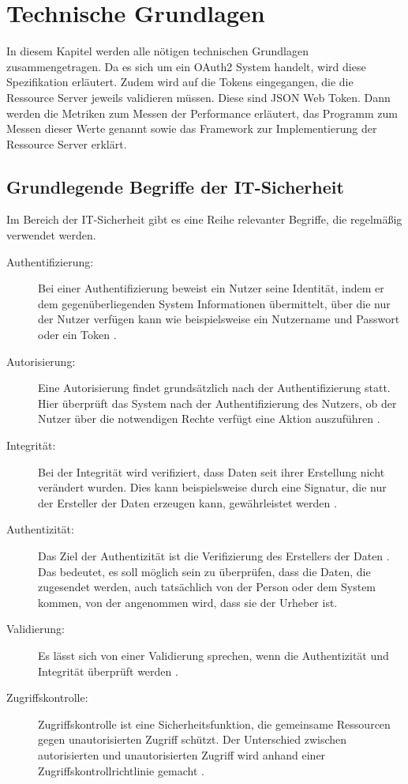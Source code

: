 \chapter{Technische Grundlagen}
\label{sec:TechnischeGrundlagen}
In diesem Kapitel werden alle nötigen technischen Grundlagen zusammengetragen. Da es sich um ein OAuth2 System handelt, wird diese Spezifikation erläutert. Zudem wird auf die Tokens eingegangen, die die Ressource Server jeweils validieren müssen. Diese sind \ac{JSON} Web Token. Dann werden die Metriken zum Messen der Performance erläutert, das Programm zum Messen dieser Werte genannt sowie das Framework zur Implementierung der Ressource Server erklärt. 

%
%
\section{Grundlegende Begriffe der IT-Sicherheit}
\label{sec:GrundlegenderBegriffederIT-Sicherheit}
Im Bereich der IT-Sicherheit gibt es eine Reihe relevanter Begriffe, die regelmäßig verwendet werden.

\begin{description}
  \item[Authentifizierung:] Bei einer Authentifizierung beweist ein Nutzer seine Identität, indem er dem gegenüberliegenden System Informationen übermittelt, über die nur der Nutzer verfügen kann wie beispielsweise ein Nutzername und Passwort oder ein Token \citep{Cankaya2011}.
  \item[Autorisierung:] Eine Autorisierung findet grundsätzlich nach der Authentifizierung statt. Hier überprüft das System nach der Authentifizierung des Nutzers, ob der Nutzer über die notwendigen Rechte verfügt eine Aktion auszuführen \citep{Authorization2011}. 
  \item[Integrität:] Bei der Integrität wird verifiziert, dass Daten seit ihrer Erstellung nicht verändert wurden. Dies kann beispielsweise durch eine Signatur, die nur der Ersteller der Daten erzeugen kann, gewährleistet werden \citep{connect2id:2021}.
  \item[Authentizität:] Das Ziel der Authentizität ist die Verifizierung des Erstellers der Daten \citep{connect2id:2021}. Das bedeutet, es soll möglich sein zu überprüfen, dass die Daten, die zugesendet werden, auch tatsächlich von der Person oder dem System kommen, von der angenommen wird, dass sie der Urheber ist.
  \item[Validierung:] Es lässt sich von einer Validierung sprechen, wenn die Authentizität und Integrität überprüft werden \citep{springsecuritydoc:2021}.
  \item[Zugriffskontrolle:] Zugriffskontrolle ist eine Sicherheitsfunktion, die gemeinsame Ressourcen gegen unautorisierten Zugriff schützt. Der Unterschied zwischen autorisierten und unautorisierten Zugriff wird anhand einer Zugriffskontrollrichtlinie gemacht \citep{Brose2011}. 
\end{description}

